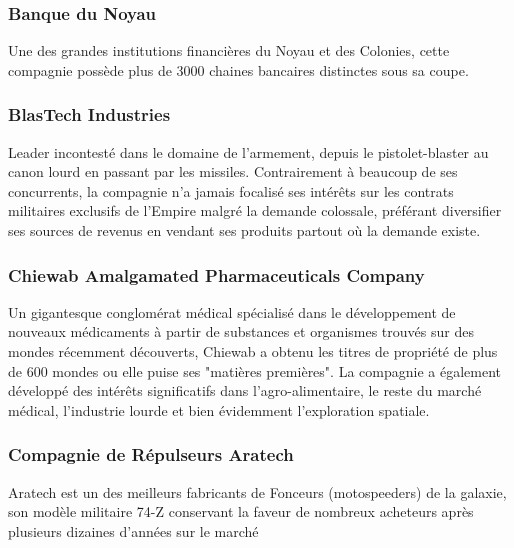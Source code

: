 \documentclass[twoside]{article}
\begin{document}
\subsubsection{Banque du Noyau }
Une des grandes institutions financières du Noyau et des Colonies, cette compagnie possède plus de 3000 chaines bancaires distinctes sous sa coupe.  

\subsubsection{BlasTech Industries}
Leader incontesté dans le domaine de l'armement, depuis le pistolet-blaster au canon lourd en passant par les missiles. Contrairement à beaucoup de ses concurrents, la compagnie n'a jamais focalisé ses intérêts sur les contrats militaires exclusifs de l'Empire malgré la demande colossale, préférant diversifier ses sources de revenus en vendant ses produits partout où la demande existe.

\subsubsection{Chiewab Amalgamated Pharmaceuticals Company }
Un gigantesque conglomérat médical spécialisé dans le développement de nouveaux médicaments à partir de substances et organismes trouvés sur des mondes récemment découverts, Chiewab a obtenu les titres de propriété de plus de 600 mondes ou elle puise ses "matières premières". La compagnie a également développé des intérêts significatifs dans l'agro-alimentaire, le reste du marché médical, l'industrie lourde et bien évidemment l'exploration spatiale.

\subsubsection{Compagnie de Répulseurs Aratech}
Aratech est un des meilleurs fabricants de Fonceurs (motospeeders) de la galaxie, son modèle militaire 74-Z conservant la faveur de nombreux acheteurs après plusieurs dizaines d'années sur le marché
\end{document}
